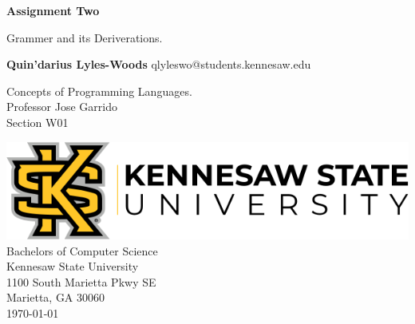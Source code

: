 \begin{titlepage}
\begin{center}
	\vspace*{1cm}

	\Huge
	\textbf{Assignment Two}

	\vspace{0.5cm}
	\LARGE
	Grammer and its Deriverations.

	\vspace{1.5cm}

	\textbf{Quin'darius Lyles-Woods}
	\Large
	qlyleswo@students.kennesaw.edu

	\vfill
	\LARGE
	Concepts of Programming Languages.	\\
	Professor Jose Garrido	\\
	Section W01
	\vspace{0.8cm}

	\includegraphics[width=\textwidth]{kennesawlogo}
	\Large
	Bachelors of Computer Science\\
	Kennesaw State University\\
	1100 South Marietta Pkwy SE\\
	Marietta, GA 30060\\
	\today	

	\vspace{1cm}

\end{center}
\end{titlepage}
